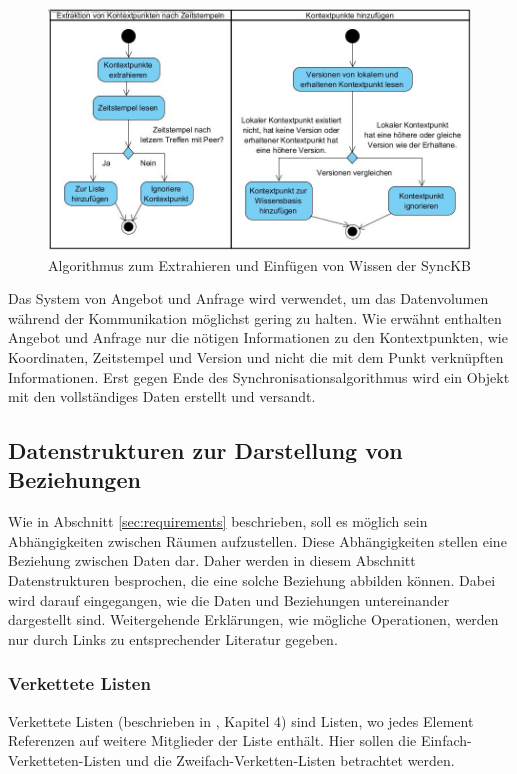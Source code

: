 \documentclass[a4paper]{article}
\begin{document}
	\begin{figure}[H] 
		\includegraphics[width=\linewidth]{../Bilder/sync_flow.jpg}
		\caption{Algorithmus zum Extrahieren und Einfügen von Wissen der SyncKB}
		\label{fig:SyncFlow}
	\end{figure}
	
	Das System von Angebot und Anfrage wird verwendet, um das Datenvolumen während
	der Kommunikation möglichst gering zu halten. Wie erwähnt enthalten Angebot
	und Anfrage nur die nötigen Informationen zu den Kontextpunkten, wie
	Koordinaten, Zeitstempel und Version und nicht die mit dem Punkt verknüpften
	Informationen. Erst gegen Ende des Synchronisationsalgorithmus wird ein 
	Objekt mit den vollständiges Daten erstellt und versandt.
	
	\subsection{Datenstrukturen zur Darstellung von Beziehungen}
	\label{sec:datastruct}
	
	Wie in Abschnitt \ref{sec:requirements} beschrieben, soll es möglich sein
	Abhängigkeiten zwischen Räumen aufzustellen. Diese Abhängigkeiten stellen
	eine Beziehung zwischen Daten dar. Daher werden in diesem Abschnitt 
	Datenstrukturen besprochen, die eine solche Beziehung abbilden können.
	Dabei wird darauf eingegangen, wie die Daten und Beziehungen untereinander
	dargestellt sind. Weitergehende Erklärungen, wie mögliche Operationen, werden
	nur durch Links zu entsprechender Literatur gegeben.
	
	\subsubsection{Verkettete Listen}
	
	Verkettete Listen (beschrieben in \cite{FundData}, Kapitel 4) sind Listen,
	wo jedes Element Referenzen auf weitere Mitglieder der Liste enthält.
	Hier sollen die Einfach-Verketteten-Listen und die Zweifach-Verketten-Listen
	betrachtet werden.
	
\end{document}
